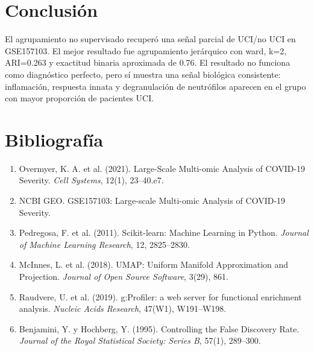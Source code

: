 \documentclass[11pt]{article}
\begin{document}
\section{Conclusión}
El agrupamiento no supervisado recuperó una señal parcial de UCI/no UCI en
GSE157103. El mejor resultado fue agrupamiento jerárquico
con ward, k=2, ARI=0.263 y exactitud binaria
aproximada de 0.76. El resultado no funciona como
diagnóstico perfecto, pero sí muestra una señal biológica consistente:
inflamación, respuesta innata y degranulación de neutrófilos aparecen en el
grupo con mayor proporción de pacientes UCI.

\section*{Bibliografía}
\begin{enumerate}
\item Overmyer, K. A. et al. (2021). Large-Scale Multi-omic Analysis of COVID-19 Severity. \textit{Cell Systems}, 12(1), 23--40.e7.
\item NCBI GEO. GSE157103: Large-scale Multi-omic Analysis of COVID-19 Severity.
\item Pedregosa, F. et al. (2011). Scikit-learn: Machine Learning in Python. \textit{Journal of Machine Learning Research}, 12, 2825--2830.
\item McInnes, L. et al. (2018). UMAP: Uniform Manifold Approximation and Projection. \textit{Journal of Open Source Software}, 3(29), 861.
\item Raudvere, U. et al. (2019). g:Profiler: a web server for functional enrichment analysis. \textit{Nucleic Acids Research}, 47(W1), W191--W198.
\item Benjamini, Y. y Hochberg, Y. (1995). Controlling the False Discovery Rate. \textit{Journal of the Royal Statistical Society: Series B}, 57(1), 289--300.
\end{enumerate}
\end{document}
